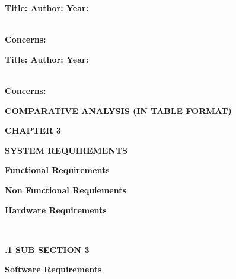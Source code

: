\documentclass[12pt,a4paper]{article}
\begin{document}
\begin{flushleft}
{\fontsize{12}{14}\selectfont\textbf{\cite{5}Title:
\newline Author:
\newline Year:}		}								
\end{flushleft}		
\blindtext\\
{\fontsize{12}{14}\selectfont\textbf{Concerns:
}}								
\begin{flushleft}
{\fontsize{12}{14}\selectfont\textbf{\cite{6}Title:
\newline Author:
\newline Year:}		}								
\end{flushleft}		
\blindtext\\
{\fontsize{12}{14}\selectfont\textbf{Concerns:
}}	
\begin{flushleft}
{\fontsize{14}{20}\selectfont\textbf{ \MakeUppercase{Comparative Analysis (In table format)} }}	\\[3mm] 	
\end{flushleft}
\newpage
\begin{flushleft}
{\fontsize{16}{20}\selectfont \textbf{CHAPTER 3}}
\end{flushleft}		
\begin{center}
{\fontsize{18}{18}\selectfont \textbf{SYSTEM REQUIREMENTS}}
\end{center}
\onehalfspacing
\begin{flushleft}
{\fontsize{14}{20}\selectfont\textbf{ Functional Requirements}		}											
\end{flushleft}		
\blindtext

\begin{flushleft}
{\fontsize{14}{20}\selectfont\textbf{ Non Functional Requiements}		}											
\end{flushleft}		
\blindtext
\begin{flushleft}
{\fontsize{14}{20}\selectfont\textbf{ Hardware Requirements}		}											
\end{flushleft}		
\blindtext
\\
\begin{flushleft}
{\fontsize{12}{12}\selectfont\textbf{.1 SUB SECTION 3}		}											
\end{flushleft}		
\blindtext

\begin{flushleft}
{\fontsize{14}{20}\selectfont\textbf{ Software Requirements}		}											
\end{flushleft}		
\blindtext
\end{document}
